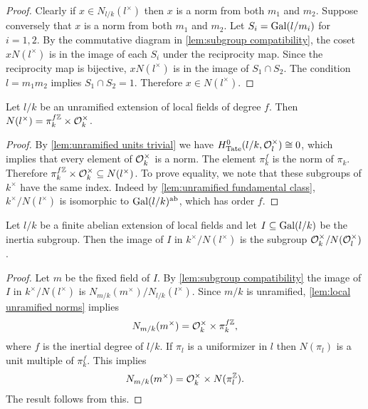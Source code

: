 \begin{proof}
	Clearly if $x \in N_{l/k}(l^\times)$ then $x$ is a norm from both $m_1$ and $m_2$.
	Suppose conversely that $x$ is a norm from both $m_1$ and $m_2$.
	Let $S_i=\mathrm{Gal}(l/m_i)$ for $i=1,2$.
	By the commutative diagram in \ref{lem:subgroup compatibility},
	the coset $xN(l^\times)$ is in the image of each $S_i$ under the reciprocity map.
	Since the reciprocity map is bijective, $xN(l^\times)$ is in the image of
	$S_1 \cap S_2$.
	The condition $l = m_1 m_2$ implies $S_1 \cap S_2 = 1$.
	Therefore $x \in N(l^\times)$.
\end{proof}



\begin{lemma} \label{lem:local unramified norms}
	Let $l/k$ be an unramified extension of local fields of degree $f$.
	Then $N(l^\times) = \pi_k^{f{\mathbb Z}} \times {\mathcal O}_k^\times$.
\end{lemma}

\begin{proof}
	By \ref{lem:unramified units trivial} we have $H^0_{\mathrm{Tate}}(l/k,{\mathcal O}_l^\times) \cong 0$,
	which implies that every element of ${\mathcal O}_k^\times$ is a norm.
	The element $\pi_k^f$ is the norm of $\pi_k$.
	Therefore $\pi_k^{f{\mathbb Z}} \times {\mathcal O}_k^\times \subseteq N(l^\times)$.
	To prove equality, we note that these subgroups of $k^\times$ have the same index.
	Indeed by \ref{lem:unramified fundamental class}, $k^\times / N(l^\times)$
	is isomorphic to $\mathrm{Gal}(l/k)^{\mathrm{ab}}$, which has order $f$.
\end{proof}


\begin{lemma} \label{lem:local image inertia}
	Let $l/k$ be a finite abelian extension of local fields and let $I \subseteq \mathrm{Gal}(l/k)$ be
	the inertia subgroup.
	Then the image of $I$ in $k^\times / N(l^\times)$
	is the subgroup ${\mathcal O}_k^\times / N({\mathcal O}_l^\times)$.
\end{lemma}

\begin{proof}
	Let $m$ be the fixed field of $I$.
	By \ref{lem:subgroup compatibility} the image of $I$ in $k^\times / N(l^\times)$
	is $N_{m/k}(m^\times) / N_{l/k}(l^\times)$.
	Since $m/k$ is unramified, \ref{lem:local unramified norms} implies
	\[
		N_{m/k}(m^\times) = {\mathcal O}_k^\times \times \pi_k^{f{\mathbb Z}},
	\]
	where $f$ is the inertial degree of $l/k$.
	If $\pi_l$ is a uniformizer in $l$ then $N(\pi_l)$ is a unit multiple of $\pi_k^f$.
	This implies
	\[
		N_{m/k}(m^\times) = {\mathcal O}_k^\times \times N(\pi_l^{{\mathbb Z}}).
	\]
	The result follows from this.
\end{proof}


